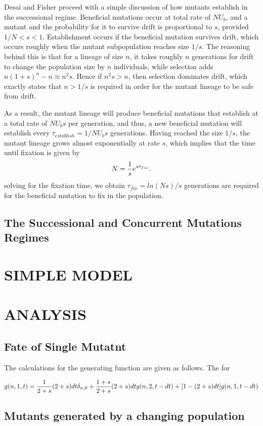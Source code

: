 \documentclass[12pt,2 column]{article}
\begin{document}
Desai and Fisher proceed with a simple discussion of how mutants establish in the successional regime.  Beneficial mutations occur at total rate of $NU_b$, and a mutant and the probability for it to survive drift is proportional to $s$, provided $1/N<s<1$.  Establishment occurs if the beneficial mutation survives drift, which occurs roughly when the mutant subpopulation reaches size $1/s$.  The reasoning behind this is that for a lineage of size $n$, it takes roughly $n$ generations for drift to change the population size by $n$ individuals, while selection adds $n(1+s)^n-n \approx n^2s$.  Hence if $n^2s>n$, then selection dominates drift, which exactly states that $n>1/s$ is required in order for the mutant lineage to be safe from drift. 

As a result, the mutant lineage will produce beneficial mutations that establish at a total rate of $NU_bs$ per generation, and thus, a new beneficial mutation will establish every $\tau_{establish} = 1/NU_bs$ generations.  Having reached the size $1/s$, the mutant lineage grows almost exponentially at rate $s$, which implies that the time until fixation is given by
\[
N={1 \over s}e^{s \tau_{fix}}.
\]
solving for the fixation time, we obtain $\tau_{fix}=ln(Ns)/s$ generations are required for the beneficial mutation to fix in the population.  
\subsection*{The Successional and Concurrent Mutations Regimes}
\section*{SIMPLE MODEL}



\section*{ANALYSIS}
\subsection*{Fate of Single Mutatnt}
The calculations for the generating function are given as follows. The for

\begin{align*}
g(n,1,t)={1\over 2+s}(2+s)dt \delta_{n,0} + {1+s\over 2+s}(2+s)dt g(n,2,t-dt)+[1-(2+s)dt] g(n,1,t-dt)
\end{align*}
\subsection*{Mutants generated by a changing population}
\end{document}
